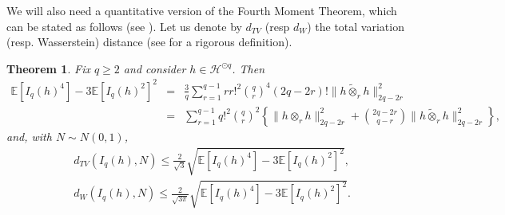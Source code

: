 \documentclass[12pt]{article}
\DeclareMathOperator{\1}{1}
\newcommand{\E}{\mathbb{E}}
\renewcommand{\phi}{\varphi}
\theoremstyle{plain}
\newtheorem{theorem}{Theorem}
\theoremstyle{definition}
\begin{document}
\medskip

We will also need a quantitative version of the Fourth Moment Theorem, which can be stated as follows (see \cite[Theorem 5.2.6 and (5.2.6)]{bluebook}). {Let us denote by $d_{TV}$ (resp $d_W$) the total variation (resp. Wasserstein) distance (see \cite[Appendix C]{bluebook} for a rigorous definition).}
\begin{theorem}\label{thm:4thQuant}
Fix $q\ge 2$ and consider $h\in \mathcal H^{\odot q}$. 
Then
\begin{eqnarray}
\E[I_q(h)^4]-3\E[I_q(h)^2]^2
&=&\frac3q\sum_{r=1}^{q-1} rr!^2\binom{q}{r}^4(2q-2r)!
\|h\widetilde{\otimes}_r  h\|^2_{2q-2r}\\
&=&\sum_{r=1}^{q-1} q!^2\binom{q}{r}^2\left\{\|h\otimes_r h\|^2_{2q-2r}+\binom{2q-2r}{q-r}\|h\widetilde{\otimes}_r h\|^2_{2q-2r}\right\},
\end{eqnarray}
and, with $N\sim N(0,1)$,
\begin{align}
    &d_{TV}(I_q(h),N)\le \frac{2}{\sqrt{3}}\sqrt{\E[I_q(h)^4]-3\E[I_q(h)^2]^2},\\
    &{d_{W}(I_q(h),N)\le \frac{2}{\sqrt{3\pi}}\sqrt{\E[I_q(h)^4]-3\E[I_q(h)^2]^2}.} 
\end{align}
\end{theorem}

\end{document}
